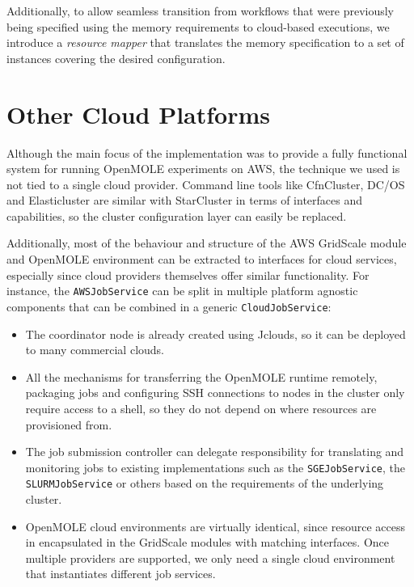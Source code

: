 Additionally, to allow seamless transition from workflows that were previously being specified using the memory requirements to cloud-based executions, we introduce a \textit{resource mapper} that translates the memory specification to a set of instances covering the desired configuration.

\section{Other Cloud Platforms}

Although the main focus of the implementation was to provide a fully functional system for running OpenMOLE experiments on AWS, the technique we used is not tied to a single cloud provider. Command line tools like CfnCluster, DC/OS and Elasticluster are similar with StarCluster in terms of interfaces and capabilities, so the cluster configuration layer can easily be replaced.

Additionally, most of the behaviour and structure of the AWS GridScale module and OpenMOLE environment can be extracted to interfaces for cloud services, especially since cloud providers themselves offer similar functionality. For instance, the \verb|AWSJobService| can be split in multiple platform agnostic components that can be combined in a generic \verb|CloudJobService|:

\begin{itemize}
	\item The coordinator node is already created using Jclouds, so it can be deployed to many commercial clouds.
	\item All the mechanisms for transferring the OpenMOLE runtime remotely, packaging jobs and configuring SSH connections to nodes in the cluster only require access to a shell, so they do not depend on where resources are provisioned from.
	\item The job submission controller can delegate responsibility for translating and monitoring jobs to existing implementations such as the \verb|SGEJobService|, the \verb|SLURMJobService| or others based on the requirements of the underlying cluster.
	\item OpenMOLE cloud environments are virtually identical, since resource access in encapsulated in the GridScale modules with matching interfaces. Once multiple providers are supported, we only need a single cloud environment that instantiates different job services.
\end{itemize}

\vspace{-1mm}
